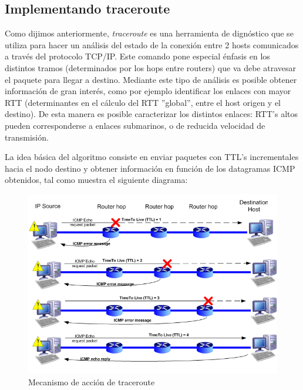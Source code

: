 \subsection{Implementando traceroute}

Como dijimos anteriormente, \emph{traceroute} es una herramienta de dignóstico que se utiliza para hacer
un análisis del estado de la conexión entre 2 hosts comunicados a través del protocolo TCP/IP.
Este comando pone especial énfasis en los distintos tramos (determinados por los hops entre routers)
que va debe atravesar el paquete para llegar a destino.
Mediante este tipo de análisis es posible obtener información de gran interés, como por
ejemplo identificar los enlaces con mayor RTT (determinantes en el cálculo del
RTT ''global'', entre el host origen y el destino). De esta manera es posible caracterizar los distintos
enlaces: RTT's altos pueden corresponderse a enlaces submarinos, o de reducida velocidad de transmisión.

La idea básica del algoritmo consiste en enviar paquetes con TTL's incrementales hacia el nodo destino
y obtener información en función de los datagramas ICMP obtenidos, tal como muestra el siguiente
diagrama:

\begin{figure}[!h]
  \begin{center}
      \includegraphics[scale=0.4]{imagenes/traceroute.png}
      \caption{Mecanismo de acción de traceroute}
      \label{fig:contra1}
  \end{center}
\end{figure}

